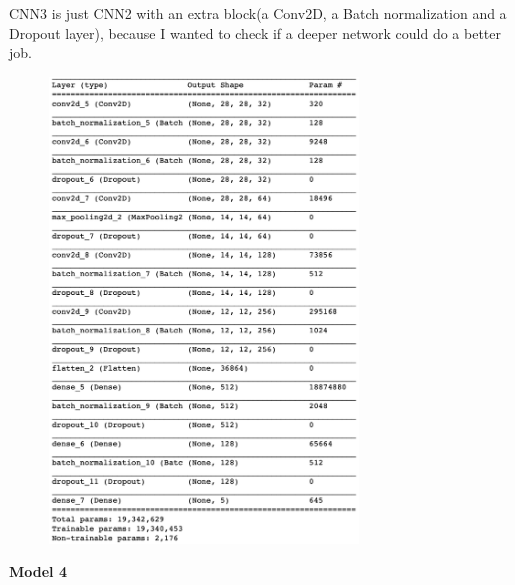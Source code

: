 \documentclass[12pt]{article}
\begin{document}
CNN3 is just CNN2 with an extra block(a Conv2D, a Batch normalization and a Dropout layer), because I wanted to check if a deeper network could do a better job.
\begin{figure}[H]
\begin{center}
    \includegraphics[width=0.73\textwidth]{./plots/3.png}
\end{center}
\end{figure}
\vspace*{-1.0cm}

\textbf{Model 4}
\end{document}

